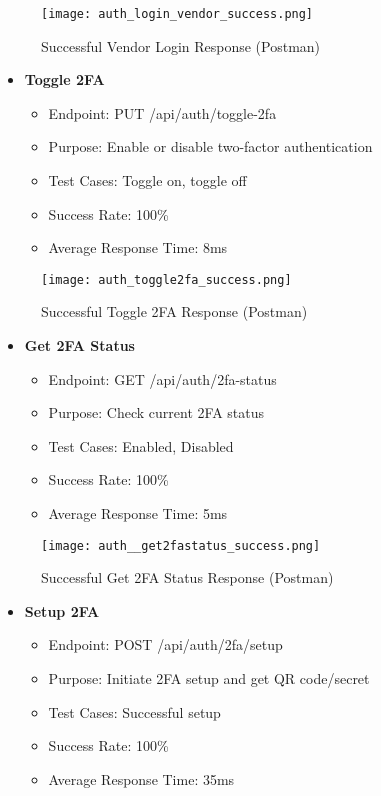 \begin{figure}[h!]
    \centering
    \texttt{[image: auth\_login\_vendor\_success.png]}
    \caption{Successful Vendor Login Response (Postman)}
    \label{fig:auth_login_vendor_success}
\end{figure}

\begin{itemize}
    \item \textbf{Toggle 2FA}
    \begin{itemize}
        \item Endpoint: PUT /api/auth/toggle-2fa
        \item Purpose: Enable or disable two-factor authentication
        \item Test Cases: Toggle on, toggle off
        \item Success Rate: 100\%
        \item Average Response Time: 8ms
    \end{itemize}
\end{itemize}

\begin{figure}[h!]
    \centering
    \texttt{[image: auth\_toggle2fa\_success.png]}
    \caption{Successful Toggle 2FA Response (Postman)}
    \label{fig:auth_toggle2fa_success}
\end{figure}

\begin{itemize}
    \item \textbf{Get 2FA Status}
    \begin{itemize}
        \item Endpoint: GET /api/auth/2fa-status
        \item Purpose: Check current 2FA status
        \item Test Cases: Enabled, Disabled
        \item Success Rate: 100\%
        \item Average Response Time: 5ms
    \end{itemize}
\end{itemize}

\begin{figure}[h!]
    \centering
    \texttt{[image: auth\_\_get2fastatus\_success.png]}
    \caption{Successful Get 2FA Status Response (Postman)}
    \label{fig:auth_get2fastatus_success}
\end{figure}

\begin{itemize}
    \item \textbf{Setup 2FA}
    \begin{itemize}
        \item Endpoint: POST /api/auth/2fa/setup
        \item Purpose: Initiate 2FA setup and get QR code/secret
        \item Test Cases: Successful setup
        \item Success Rate: 100\%
        \item Average Response Time: 35ms
    \end{itemize}
\end{itemize}

